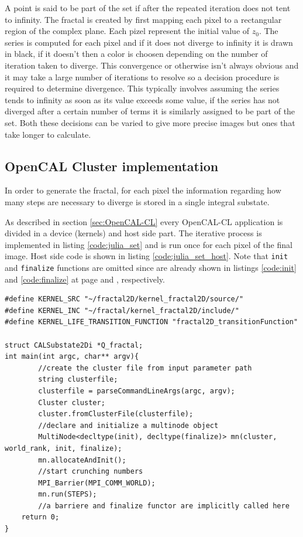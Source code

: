A point is said to be part of the set if after the repeated iteration does not tent to infinity.
The fractal  is created by first mapping each pixel to a rectangular region of the complex plane. Each pizel represent the initial value of $z_0$. The series is computed for each pixel and if it does not diverge to infinity it is drawn in black, if it doesn't then a color is choosen depending on the number of iteration taken to diverge. This convergence or otherwise isn't always obvious and it may take a large number of iterations to resolve so a decision procedure is required to determine divergence. This typically involves assuming the series tends to infinity as soon as its value exceeds some value, if the series has not diverged after a certain number of terms it is similarly assigned to be part of the set. Both these decisions can be varied to give more precise images but ones that take longer to calculate. 

\subsection{OpenCAL Cluster implementation}
In order to generate the fractal, for each pixel the information regarding how many steps are necessary to diverge is stored in a single integral substate.

As described in section \ref{sec:OpenCAL-CL} every OpenCAL-CL application is divided in a device (kernels) and host side part. 
The iterative process is implemented in listing \ref{code:julia_set} and is run once for each pixel of the final image.
Host side code is shown in listing \ref{code:julia_set_host}. Note that \texttt{init} and \texttt{finalize} functions are omitted since are already shown in listings \ref{code:init} and \ref{code:finalize} at page \pageref{code:init} and \pageref{code:finalize} , respectively.

\begin{lstlisting}
#define KERNEL_SRC "~/fractal2D/kernel_fractal2D/source/"
#define KERNEL_INC "~/fractal/kernel_fractal2D/include/"
#define KERNEL_LIFE_TRANSITION_FUNCTION "fractal2D_transitionFunction"

struct CALSubstate2Di *Q_fractal; 
int main(int argc, char** argv){
		//create the cluster file from input parameter path
		string clusterfile;
		clusterfile = parseCommandLineArgs(argc, argv);
		Cluster cluster;
		cluster.fromClusterFile(clusterfile);
	    //declare and initialize a multinode object
		MultiNode<decltype(init), decltype(finalize)> mn(cluster, world_rank, init, finalize);
		mn.allocateAndInit();
	    //start crunching numbers
		MPI_Barrier(MPI_COMM_WORLD);
		mn.run(STEPS);
		//a barriere and finalize functor are implicitly called here
	return 0;
}



\end{lstlisting}

